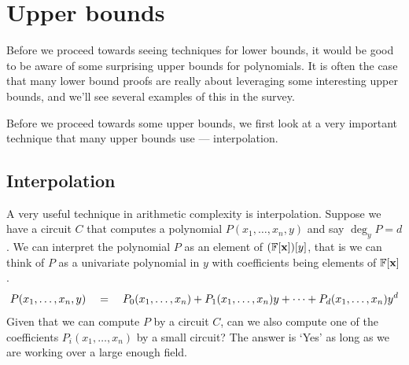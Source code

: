 \chapter{Upper bounds}\label{chap:upper-bounds}

Before we proceed towards seeing techniques for lower bounds, it would be good to be aware of some surprising upper bounds for polynomials. 
It is often the case that many lower bound proofs are really about leveraging some interesting upper bounds, and we'll see several examples of this in the survey. 

Before we proceed towards some upper bounds, we first look at a very important technique that many upper bounds use --- interpolation.

\section{Interpolation}

A very useful technique in arithmetic complexity is interpolation. Suppose we have a circuit $C$ that computes a polynomial $P(x_1,\ldots, x_n, y)$ and say $\deg_y P = d$. We can interpret the polynomial $P$ as an element of $(\mathbb{F}[\mathbf{x}])[y]$, that is we can think of $P$ as a univariate polynomial in $y$ with coefficients being elements of $\mathbb{F}[\mathbf{x}]$. 
\[
P(x_1,\ldots, x_n, y) \quad = \quad P_0(x_1,\ldots, x_n) + P_1(x_1,\ldots, x_n) y + \cdots + P_d(x_1,\ldots, x_n) y^d
\]
Given that we can compute $P$ by a circuit $C$, can we also compute one of the coefficients $P_i(x_1,\ldots, x_n)$ by a small circuit? The answer is `Yes' as long as we are working over a large enough field. 


